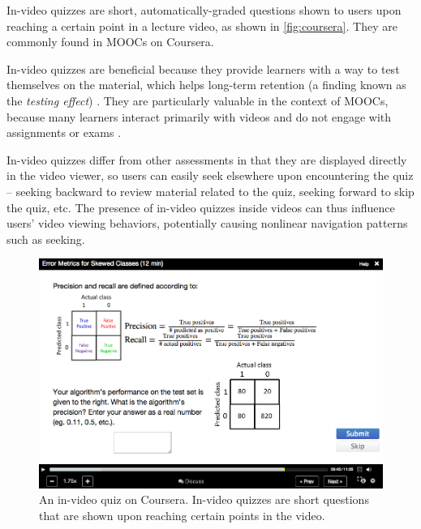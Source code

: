 \documentclass{sigchi}
\begin{document}
In-video quizzes are short, automatically-graded questions shown to users upon reaching a certain point in a lecture video, as shown in \autoref{fig:coursera}. They are commonly found in MOOCs on Coursera. %

In-video quizzes are beneficial because they provide learners with a way to test themselves on the material, which helps long-term retention (a finding known as the \emph{testing effect}) \cite{testingeffect}. They are particularly valuable in the context of MOOCs, because many learners interact primarily with videos and do not engage with assignments or exams \cite{renedisengagement} \cite{ashton}.



In-video quizzes differ from other assessments in that they are displayed directly in the video viewer, so users can easily seek elsewhere upon encountering the quiz -- seeking backward to review material related to the quiz, seeking forward to skip the quiz, etc.
The presence of in-video quizzes inside videos can thus influence users' video viewing behaviors, potentially causing nonlinear navigation patterns such as seeking. %

\begin{figure}
\includegraphics[width=1.0\columnwidth]{coursera}
\caption{An in-video quiz on Coursera. In-video quizzes are short questions that are shown upon reaching certain points in the video.}
\label{fig:coursera}
\end{figure}
\end{document}
